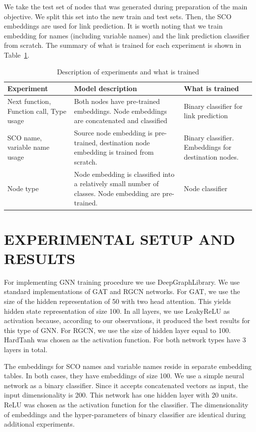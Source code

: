 \documentclass[a4paper,twoside]{article}
\begin{document}
We take the test set of nodes that was generated during preparation of the main objective. We split this set into the new train and test sets. Then, the SCO embeddings are used for link prediction. It is worth noting that we train embedding for names (including variable names) and the link prediction classifier from scratch. The summary of what is trained for each experiment is shown in Table~\ref{tbl:experiment_desc}.

\begin{table}
    \centering
    \caption{Description of experiments and what is trained}\label{tbl:experiment_desc}
    \begin{tabular}{p{3cm}p{6cm}p{6cm}}
    \toprule
        \textbf{Experiment} & \textbf{Model description} & \textbf{What is trained} \\ \midrule
        Next function, Function call, Type usage & Both nodes have pre-trained embeddings. Node embeddings are concatenated and classified & Binary classifier for link prediction \\ \midrule
        SCO name, variable name usage & Source node embedding is pre-trained, destination node embedding is trained from scratch. & Binary classifier. Embeddings for destination nodes. \\ \midrule
        Node type & Node embedding is classified into a relatively small number of classes. Node embedding are pre-trained. & Node classifier \\ \bottomrule
    \end{tabular}
\end{table}



\section{\uppercase{Experimental Setup and Results}}

For implementing GNN training procedure we use DeepGraphLibrary. We use standard implementations of GAT and RGCN networks. For GAT, we use the size of the hidden representation of 50 with two head attention. This yields hidden state representation of size 100. In all layers, we use LeakyReLU as activation because, according to our observations, it produced the best results for this type of GNN\@. For RGCN, we use the size of hidden layer equal to 100. HardTanh was chosen as the activation function. For both network types have 3 layers in total. 

The embeddings for SCO names and variable names reside in separate embedding tables. In both cases, they have embeddings of size 100. We use a simple neural network as a binary classifier. Since it accepts concatenated vectors as input, the input dimensionality is 200. This network has one hidden layer with 20 units. ReLU was chosen as the activation function for the classifier. The dimensionality of embeddings and the hyper-parameters of binary classifier are identical during additional experiments.
\end{document}
